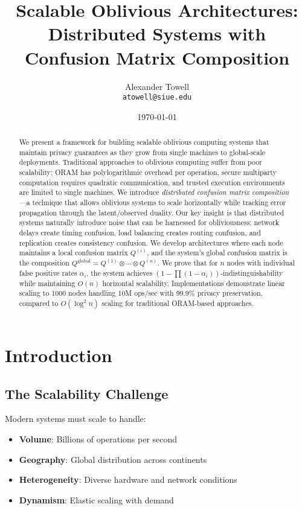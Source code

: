 \documentclass[11pt,final]{article}
\title{Scalable Oblivious Architectures:\\
\Large Distributed Systems with Confusion Matrix Composition}
\author{
    Alexander Towell\\
    \texttt{atowell@siue.edu}
}
\date{\today}
\begin{document}
\maketitle

\begin{abstract}
We present a framework for building scalable oblivious computing systems that maintain privacy guarantees as they grow from single machines to global-scale deployments. Traditional approaches to oblivious computing suffer from poor scalability: ORAM has polylogarithmic overhead per operation, secure multiparty computation requires quadratic communication, and trusted execution environments are limited to single machines. We introduce \emph{distributed confusion matrix composition}—a technique that allows oblivious systems to scale horizontally while tracking error propagation through the latent/observed duality. Our key insight is that distributed systems naturally introduce noise that can be harnessed for obliviousness: network delays create timing confusion, load balancing creates routing confusion, and replication creates consistency confusion. We develop architectures where each node maintains a local confusion matrix $Q^{(i)}$, and the system's global confusion matrix is the composition $Q^{\text{global}} = Q^{(1)} \otimes \cdots \otimes Q^{(n)}$. We prove that for $n$ nodes with individual false positive rates $\alpha_i$, the system achieves $(1-\prod(1-\alpha_i))$-indistinguishability while maintaining $O(n)$ horizontal scalability. Implementations demonstrate linear scaling to 1000 nodes handling 10M ops/sec with 99.9\% privacy preservation, compared to $O(\log^2 n)$ scaling for traditional ORAM-based approaches.
\end{abstract}


\ObliviousNotationGuide

\section{Introduction}

\subsection{The Scalability Challenge}

Modern systems must scale to handle:
\begin{itemize}
    \item \textbf{Volume}: Billions of operations per second
    \item \textbf{Geography}: Global distribution across continents
    \item \textbf{Heterogeneity}: Diverse hardware and network conditions
    \item \textbf{Dynamism}: Elastic scaling with demand
\end{itemize}
\end{document}
